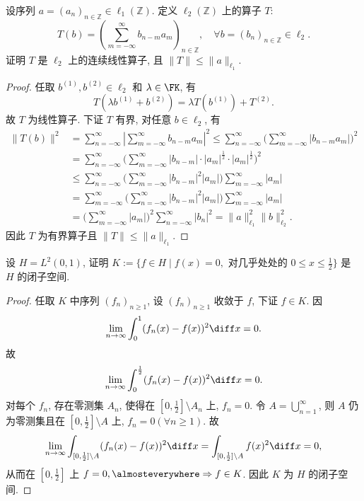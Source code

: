 \documentclass{mathexercise}
\begin{document}
\begin{exercise}
    设序列 $a=(a_{n})_{n\in\mathbb{Z}}\in\ell_{1}(\mathbb{Z})$. 定义 $\ell_{2}(\mathbb{Z})$ 上的算子 $T$:
    \[
    T(b)=\left(\sum_{m=-\infty}^{\infty} b_{n-m} a_{m}\right)_{n\in\mathbb{Z}}, \quad\forall b=(b_{n})_{n\in\mathbb{Z}}\in\ell_{2}.
    \]
    证明 $T$ 是 $\ell_2$ 上的连续线性算子, 且 $\|T\|\leq\|a\|_{\ell_1}$.
\end{exercise}

\begin{proof}
    任取 $b^{(1)},b^{(2)}\in\ell_2$ 和 $\lambda\in\FK$, 有
    \[T(\lambda b^{(1)}+b^{(2)})=\lambda T(b^{(1)})+T^{(2)}.\]
    故 $T$ 为线性算子. 下证 $T$ 有界, 对任意 $b\in\ell_2$, 有
    \begin{align*}
        \|T(b)\|^2
        & =\sum_{n=-\infty}^{\infty}\left|\sum_{m=-\infty}^{\infty}b_{n-m}a_m\right|^2 \leq\sum_{n=-\infty}^{\infty}\biggl(\sum_{m=-\infty}^{\infty}|b_{n-m}a_m|\biggr)^2 \\
        & =\sum_{n=-\infty}^{\infty}\biggl(\sum_{m=-\infty}^{\infty}|b_{n-m}|\cdot|a_m|^{\frac{1}{2}}\cdot|a_m|^{\frac{1}{2}}\biggr)^2 \\
        & \leq\sum_{n=-\infty}^{\infty}\biggl(\sum_{m=-\infty}^{\infty}|b_{n-m}|^2|a_m|\biggr)\sum_{m=-\infty}^{\infty}|a_m| \\
        & =\sum_{m=-\infty}^{\infty}\biggl(\sum_{n=-\infty}^{\infty}|b_{n-m}|^2|a_m|\biggr)\sum_{m=-\infty}^{\infty}|a_m| \\
        & =\biggl(\sum_{m=-\infty}^{\infty}|a_m|\biggr)^2\sum_{n=-\infty}^{\infty}|b_n|^2=\|a\|_{\ell_1}^2\|b\|_{\ell_2}^2.
    \end{align*}
    因此 $T$ 为有界算子且 $\|T\|\leq\|a\|_{\ell_1}$.
\end{proof}



\begin{exercise}
    设 $H=L^2(0,1)$, 证明 $K:=\{f\in H\mid f(x)=0,\text{\ 对几乎处处的\ }0\leq x\leq\frac{1}{2}\}$
    是 $H$ 的闭子空间.
\end{exercise}

\begin{proof}
    任取 $K$ 中序列 $(f_n)_{n\geq 1}$, 设 $(f_n)_{n\geq 1}$ 收敛于 $f$, 下证 $f\in K$. 因
    \[\lim_{n\to\infty}\int_0^1 (f_n(x)-f(x))^2\diff x=0.\]
    故
    \[\lim_{n\to\infty}\int_0^{\frac{1}{2}} (f_n(x)-f(x))^2\diff x=0.\]
    对每个 $f_n$, 存在零测集 $A_n$, 使得在 $[0,\frac{1}{2}]\setminus A_n$ 上, $f_n=0$.
    令 $A=\bigcup_{n=1}^{\infty}$, 则 $A$ 仍为零测集且在 $[0,\frac{1}{2}]\setminus A$
    上, $f_n=0(\forall n\geq 1)$. 故
    \[\lim_{n\to\infty}\int_{[0,\frac{1}{2}]\setminus A}(f_n(x)-f(x))^2\diff x=\int_{[0,\frac{1}{2}]\setminus A}f(x)^2\diff x=0,\]
    从而在 $[0,\frac{1}{2}]$ 上 $f=0,\almosteverywhere\Rightarrow f\in K$.
    因此 $K$ 为 $H$ 的闭子空间.
\end{proof}
\end{document}
